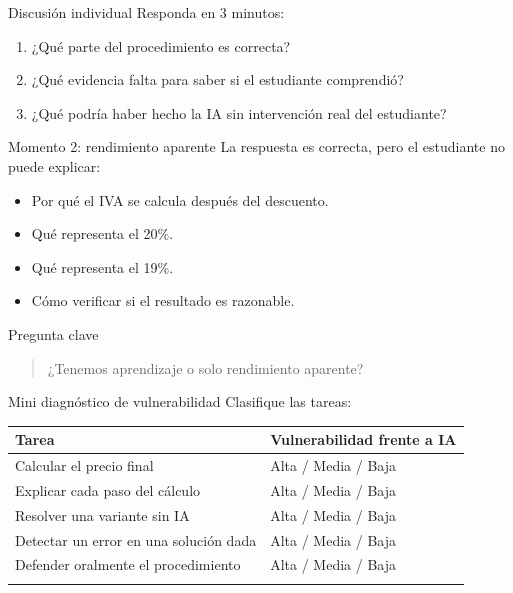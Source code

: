 \documentclass[
  ignorenonframetext,
  aspectratio=169,
  spanish,
]{beamer}
\newcounter{none} %
\providecommand{\tightlist}{%
  \setlength{\itemsep}{0pt}\setlength{\parskip}{0pt}}
\begin{document}
\begin{frame}{Discusión individual}
\protect{}\label{discusiuxf3n-individual}
Responda en 3 minutos:

\begin{enumerate}
\tightlist
\item
  ¿Qué parte del procedimiento es correcta?
\item
  ¿Qué evidencia falta para saber si el estudiante comprendió?
\item
  ¿Qué podría haber hecho la IA sin intervención real del estudiante?
\end{enumerate}
\end{frame}

\begin{frame}{Momento 2: rendimiento aparente}
\protect{}\label{momento-2-rendimiento-aparente}
La respuesta es correcta, pero el estudiante no puede explicar:

\begin{itemize}
\tightlist
\item
  Por qué el IVA se calcula después del descuento.
\item
  Qué representa el 20\%.
\item
  Qué representa el 19\%.
\item
  Cómo verificar si el resultado es razonable.
\end{itemize}

\begin{block}{Pregunta clave}
\protect{}\label{pregunta-clave}
\begin{quote}
¿Tenemos aprendizaje o solo rendimiento aparente?
\end{quote}
\end{block}
\end{frame}

\begin{frame}{Mini diagnóstico de vulnerabilidad}
\protect{}\label{mini-diagnuxf3stico-de-vulnerabilidad}
Clasifique las tareas:

{\def\LTcaptype{none} %
\begin{longtable}[]{@{}ll@{}}
\toprule\noalign{}
Tarea & Vulnerabilidad frente a IA \\
\midrule\noalign{}
\endhead
Calcular el precio final & Alta / Media / Baja \\
Explicar cada paso del cálculo & Alta / Media / Baja \\
Resolver una variante sin IA & Alta / Media / Baja \\
Detectar un error en una solución dada & Alta / Media / Baja \\
Defender oralmente el procedimiento & Alta / Media / Baja \\
\bottomrule\noalign{}
\end{longtable}
}
\end{frame}
\end{document}
